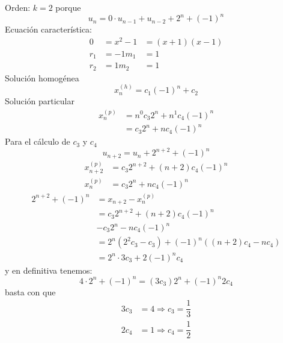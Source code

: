 \begin{ejercicio}
    Orden: $k = 2$ porque
    \begin{equation*}
        u_n = 0 \cdot u_{n-1} + u_{n-2} + 2^n + {(-1)}^n
    \end{equation*}
    Ecuación característica:
    \begin{align*}
        0 &= x^2 - 1 &= (x+1)(x-1) \\
        r_1 &= -1 m_1 &= 1 \\
        r_2 &= 1 m_2 &= 1
    \end{align*}
    Solución homogénea
    \begin{equation*}
        x_n^{(h)} = c_1{(-1)}^n + c_2 
    \end{equation*}
    Solución particular
    \begin{align*}
        x_n^{(p)} &= n^0 c_3 2^n + n^1 c_4 {(-1)}^n \\
                  &= c_3 2^n + nc_4{(-1)}^n
    \end{align*}
    Para el cálculo de $c_3$ y $c_4$
    \begin{equation*}
        u_{n+2} = u_{n} + 2^{n+2} + {(-1)}^{n}
    \end{equation*}
    \begin{align*}
        x_{n+2}^{(p)} &= c_3 2^{n+2} + (n+2)c_4{(-1)}^n \\
        x_n^{(p)} &= c_3 2^n + nc_4 {(-1)}^n
    \end{align*}
    \begin{align*}
        2^{n+2}+{(-1)}^{n} &= x_{n+2} - x_n^{(p)} \\
                           &= c_3 2^{n+2} + (n+2)c_4 {(-1)}^{n} \\
                           &- c_3 2^n - nc_4 {(-1)}^{n} \\
                           &= 2^n (2^2 c_3 - c_3) + {(-1)}^{n}((n+2)c_4-nc_4) \\
                           &= 2^n \cdot 3c_3 + 2 {(-1)}^{n}c_4
    \end{align*}
    y en definitiva tenemos:
    \begin{equation*}
        4\cdot 2^n + {(-1)}^{n} = (3c_3)2^n + {(-1)}^{n}2c_4
    \end{equation*}
    basta con que
    \begin{align*}
        3c_3 &= 4 \Longrightarrow c_3 = \dfrac{1}{3} \\
        2c_4 &= 1 \Longrightarrow c_4 = \dfrac{1}{2} \\

\end{align*}
\end{ejercicio}
